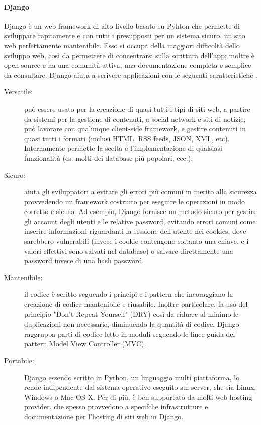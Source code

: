 \paragraph{Django}
Django è un web framework di alto livello basato su Pyhton che permette di sviluppare rapitamente e con tutti i presupposti per un sistema sicuro, un sito web
perfettamente mantenibile. Esso si occupa della maggiori difficoltà dello sviluppo web, così da permettere di concentrarsi sulla scrittura dell'app; inoltre 
è open-source e ha una comunità attiva, una documentazione completa e semplice da consultare.\hfill\break
Django aiuta a scrivere applicazioni con le seguenti caratteristiche \cite{django-documentation}.
\begin{description}
    \item[Versatile:] può essere usato per la creazione di quasi tutti i tipi di siti web, a partire da sistemi per la gestione di contenuti,
    a social network e siti di notizie; può lavorare con qualunque client-side framework, e gestire contenuti in quasi tutti i formati (inclusi HTML, 
    RSS feeds, JSON, XML, etc). Internamente permette la scelta e l'implementazione di qualsiasi funzionalità (es. molti dei database più popolari, ecc.).
    \item[Sicuro:] aiuta gli sviluppatori a evitare gli errori più comuni in merito alla sicurezza provvedendo un framework costruito per eseguire 
    le operazioni in modo corretto e sicuro. Ad esempio, Django fornisce un metodo sicuro per gestire gli account degli utenti e le relative 
    password, evitando errori comuni come inserire informazioni riguardanti la sessione dell'utente nei cookies, dove sarebbero vulnerabili (invece i cookie 
    contengono soltanto una chiave, e i valori effettivi sono salvati nel database) o salvare direttamente una password invece di una hash password.
    \item[Mantenibile:] il codice è scritto seguendo i principi e i pattern che incoraggiano la creazione di codice mantenibile e riusabile. Inoltre 
    particolare, fa uso del principio "Don't Repeat Yourself" (DRY) così da ridurre al minimo le duplicazioni non necessarie, diminuendo la quantità di codice.
    Django raggruppa parti di codice letto in moduli seguendo le linee guida del pattern Model View Controller (MVC).
    \item[Portabile:] Django essendo scritto in Python, un linguaggio multi piattaforma, lo rende indipendente dal sistema operativo eseguito sul server, che 
    sia Linux, Windows o Mac OS X. Per di più, è ben supportato da molti web hosting provider, che spesso provvedono a specifche infrastrutture
    e documentazione per l'hosting di siti web in Django.
\end{description}
